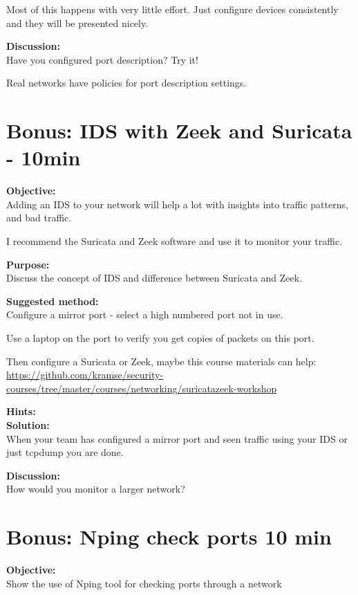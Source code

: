 \documentclass[a4paper,11pt,notitlepage]{report}
\begin{document}
Most of this happens with very little effort. Just configure devices consistently and they will be presented nicely.

{\bf Discussion:}\\
Have you configured port description? Try it!

Real networks have policies for port description settings.




\chapter{Bonus: IDS with Zeek and Suricata - 10min}
\label{ex:suricata-real-network}

{\bf Objective:}\\
Adding an IDS to your network will help a lot with insights into traffic patterns, and bad traffic.

I recommend the Suricata and Zeek software and use it to monitor your traffic.

{\bf Purpose:}\\
Discuss the concept of IDS and difference between Suricata and Zeek.

{\bf Suggested method:}\\
Configure a mirror port - select a high numbered port not in use.

Use a laptop on the port to verify you get copies of packets on this port.

Then configure a Suricata or Zeek, maybe this course materials can help:\\
\url{https://github.com/kramse/security-courses/tree/master/courses/networking/suricatazeek-workshop}


{\bf Hints:}\\


{\bf Solution:}\\
When your team has configured a mirror port and seen traffic using your IDS or just tcpdump you are done.

{\bf Discussion:}\\
How would you monitor a larger network?



\chapter{Bonus: Nping check ports 10 min}
\label{ex:nping-tcp}
{\bf Objective:} \\
Show the use of Nping tool for checking ports through a network
\end{document}
